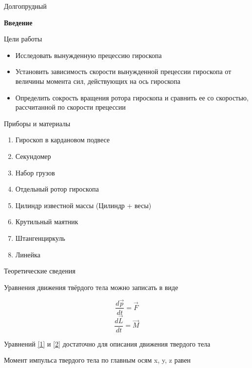 \documentclass[12pt,a4paper]{article}
\begin{document}
\begin{center}
Долгопрудный 
\end{center}
\thispagestyle{empty}
\newpage
\begin{center}
\large{\bf Введение} 
\end{center}
\begin{center}
\large{Цели работы} \break
\end{center}
\begin{itemize}
\item Исследовать вынужденную прецессию гироскопа
\item Установить зависимость скорости вынужденной прецессии гироскопа от величины момента сил, действующих на ось гироскопа
\item Определить сокрость вращения ротора гироскопа и сравнить ее со скоростью, рассчитанной по скорости прецессии 
\end{itemize}
\hfill \break
\begin{center}
\large{Приборы и материалы}
\end{center}
\begin{enumerate}
\item Гироскоп в кардановом подвесе
\item Секундомер	
\item Набор грузов
\item Отдельный ротор гироскопа
\item Цилиндр известной массы (Цилиндр + весы)
\item Крутильный маятник
\item Штангенциркуль 
\item Линейка
\end{enumerate}
\newpage
\begin{center}
\large{Теоретические сведения}
\end{center}
\hfill
\begin{par}
Уравнения движения твёрдого тела можно записать в виде
\end{par}
\begin{equation}
\frac{d\vec{p}}{dt}=\vec{F} \label{1}
\end{equation}
\begin{equation}
\frac{d\vec{L}}{dt}=\vec{M} \label{2}
\end{equation}
\begin{par}
Уравнений \ref{1} и \ref{2} достаточно для описания движения твердого тела
\end{par}
\par Момент импульса твердого тела по главным осям x, y, z равен
\end{document}
